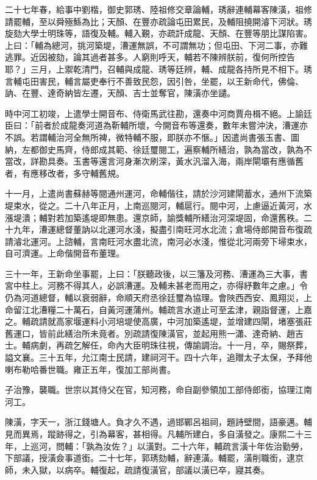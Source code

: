 \begin{pinyinscope}
二十七年春，給事中劉楷，御史郭琇、陸祖修交章論輔，琇辭連輔幕客陳潢，祖修請罷輔，至以舜殛鯀為比；天顏、在豐亦疏論屯田累民，及輔阻撓開濬下河狀。琇旋劾大學士明珠等，語復及輔。輔入覲，亦疏訐成龍、天顏、在豐等朋比謀陷害。上曰：「輔為總河，挑河築堤，漕運無誤，不可謂無功；但屯田、下河二事，亦難逃罪。近因被劾，論其過者甚多。人窮則呼天，輔若不陳辨朕前，復何所控告耶？」三月，上禦乾清門，召輔與成龍、琇等廷辨，輔、成龍各持所見不相下。琇言輔屯田害民，輔言屬吏奉行不善致民怨，因引咎，坐罷，以王新命代，佛倫、訥、在豐、達奇納皆左遷，天顏、吉士並奪官，陳潢亦坐譴。

時中河工初竣，上遣學士開音布、侍衛馬武往勘，還奏中河商賈舟楫不絕。上諭廷臣曰：「前者於成龍奏河道為靳輔所壞，今開音布等還奏，數年未嘗沖決，漕運亦不誤。若謂輔治河全無所裨，微特輔不服，即朕亦不愜。」因遣尚書張玉書、圖納，左都御史馬齊，侍郎成其範、徐廷璽閱工，遍察輔所繕治，孰為當改，孰為不當改，詳勘具奏。玉書等還言河身漸次刷深，黃水汎溜入海，兩岸閘壩有應循舊者，有應移改者，多守輔舊規。

十一月，上遣尚書蘇赫等閱通州運河，命輔偕往，請於沙河建閘蓄水，通州下流築堤束水，從之。二十八年正月，上南巡閱河，輔扈行。閱中河，上慮逼近黃河，水漲堤潰；輔對若加築遙堤即無患。還京師，諭獎輔所繕治河深堤固，命還舊秩。二十九年，漕運總督董訥以北運河水淺，擬盡引南旺河水北流；倉場侍郎開音布復疏請濬北運河。上諮輔，言南旺河水盡北流，南河必水淺，惟從北河兩旁下埽束水，自可濟運。上命偕開音布董理。

三十一年，王新命坐事罷，上曰：「朕聽政後，以三籓及河務、漕運為三大事，書宮中柱上。河務不得其人，必誤漕運。及輔未甚老而用之，亦得紓數年之慮。」令仍為河道總督，輔以衰弱辭，命順天府丞徐廷璽為協理。會陜西西安、鳳翔災，上命留江北漕糧二十萬石，自黃河運蒲州。輔疏言水道止可至孟津，親詣督運，上嘉之。輔疏請就高家堰運料小河培堤使高廣，中河加築遙堤，並增建四閘，堵塞張莊舊運口，皆前此繕治所未竟者。別疏請復陳潢官，並起用熊一瀟、達奇納、趙吉士。輔病劇，再疏乞解任，命內大臣明珠往視，傳諭調治。十一月，卒，賜祭葬，謚文襄。三十五年，允江南士民請，建祠河干。四十六年，追贈太子太保，予拜他喇布勒哈番世職。雍正五年，復加工部尚書。

子治豫，襲職。世宗以其侍父在官，知河務，命自副參領加工部侍郎銜，協理江南河工。

陳潢，字天一，浙江錢塘人。負才久不遇，過邯鄲呂祖祠，題詩壁間，語豪邁。輔見而異焉，蹤跡得之，引為幕客，甚相得。凡輔所建白，多自潢發之。康熙二十三年，上巡河，問輔：「孰為汝佐？」以潢對。二十六年，輔疏言潢十年佐治勤勞，下部議，授潢僉事道銜。二十七年，郭琇劾輔，辭連潢。輔罷，潢削職銜，逮京師，未入獄，以病卒。輔復起，疏請復潢官，部議以潢已卒，寢其奏。


\end{pinyinscope}
